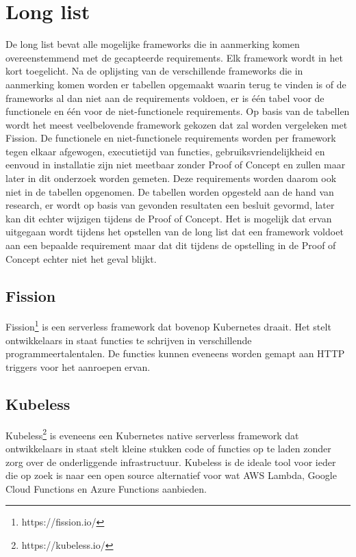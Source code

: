 \section{Long list}
De long list bevat alle mogelijke frameworks die in aanmerking komen overeenstemmend met de gecapteerde requirements. Elk framework wordt in het kort toegelicht. Na de oplijsting van de verschillende frameworks die in aanmerking komen worden er tabellen opgemaakt waarin terug te vinden is of de frameworks al dan niet aan de requirements voldoen, er is één tabel voor de functionele en één voor de niet-functionele requirements. Op basis van de tabellen wordt het meest veelbelovende framework gekozen dat zal worden vergeleken met Fission. De functionele en niet-functionele requirements worden per framework tegen elkaar afgewogen, executietijd van functies, gebruiksvriendelijkheid en eenvoud in installatie zijn niet meetbaar zonder Proof of Concept en zullen maar later in dit onderzoek worden gemeten. Deze requirements worden daarom ook niet in de tabellen opgenomen. De tabellen worden opgesteld aan de hand van research, er wordt op basis van gevonden resultaten een besluit gevormd, later kan dit echter wijzigen tijdens de Proof of Concept. Het is mogelijk dat ervan uitgegaan wordt tijdens het opstellen van de long list dat een framework voldoet aan een bepaalde requirement maar dat dit tijdens de opstelling in de Proof of Concept echter niet het geval blijkt.

\subsection{Fission}
Fission\footnote{https://fission.io/} is een serverless framework dat bovenop Kubernetes draait. Het stelt ontwikkelaars in staat functies te schrijven in verschillende programmeertalentalen. De functies kunnen eveneens worden gemapt aan HTTP triggers voor het aanroepen ervan.

\subsection{Kubeless}
Kubeless\footnote{https://kubeless.io/} is eveneens een Kubernetes native serverless framework dat ontwikkelaars in staat stelt kleine stukken code of functies op te laden zonder zorg over de onderliggende infrastructuur. Kubeless is de ideale tool voor ieder die op zoek is naar een open source alternatief voor wat AWS Lambda, Google Cloud Functions en Azure Functions aanbieden.

